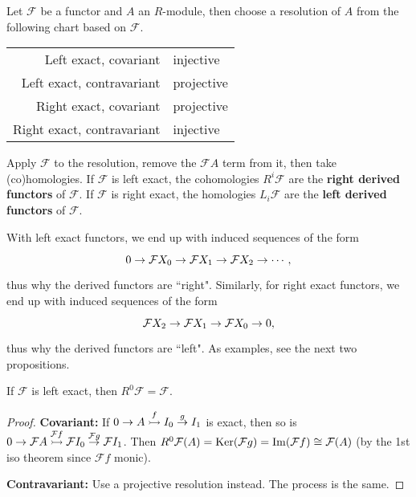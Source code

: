 \documentclass[twoside,10pt]{report}
\begin{document}
\begin{defn}[]
	Let $\mathcal{F}$ be a functor and $A$ an $R$-module, then choose a resolution of $A$ from the following chart based on $\mathcal{F}$.
\begin{center}
	\begin{tabular}{r l}
		Left exact, covariant & \qquad injective \\
		Left exact, contravariant & \qquad projective \\
		Right exact, covariant & \qquad projective \\
		Right exact, contravariant & \qquad injective
	\end{tabular}
\end{center}
Apply $\mathcal{F}$ to the resolution, remove the $\mathcal{F}A$ term from it, then take (co)homologies. If $\mathcal{F}$ is left exact, the cohomologies $R^{i}\mathcal{F}$ are the \textbf{right derived functors} of $\mathcal{F}$. If $\mathcal{F}$ is right exact, the homologies $L_{i}\mathcal{F}$ are the \textbf{left derived functors} of $\mathcal{F}$.
\end{defn}


With left exact functors, we end up with induced sequences of the form
\[
\begin{tikzcd}
	0 \to \mathcal{F}X_0 \to \mathcal{F}X_1 \to \mathcal{F}X_2 \to \cdots,
\end{tikzcd}
\] thus why the derived functors are ``right". Similarly, for right exact functors, we end up with induced sequences of the form
\[
\begin{tikzcd}
	\mathcal{F}X_2 \to \mathcal{F}X_1\to \mathcal{F}X_0\to 0,
\end{tikzcd}
\] thus why the derived functors are ``left". As examples, see the next two propositions.




\begin{prop}
	\label{left-exact-right-0}
	If $\mathcal{F}$ is left exact, then $R^0\mathcal{F}=\mathcal{F}$.
\end{prop}
\begin{proof}
	\textbf{Covariant:} If $0\to A\stackrel{f}{\rightarrowtail } I_0 \stackrel{g}{\to } I_1$ is exact, then so is $0\to \mathcal{F}A\stackrel{\mathcal{F}f}{\rightarrowtail } \mathcal{F}I_0\stackrel{\mathcal{F}g}{\to } \mathcal{F}I_1 $. Then $R^{0}\mathcal{F}(A) = \operatorname{Ker} (\mathcal{F}g) = \operatorname{Im} (\mathcal{F}f) \cong \mathcal{F}(A)$ (by the 1st iso theorem since $\mathcal{F}f$ monic).

	\textbf{Contravariant:} Use a projective resolution instead. The process is the same.
\end{proof}
\end{document}
